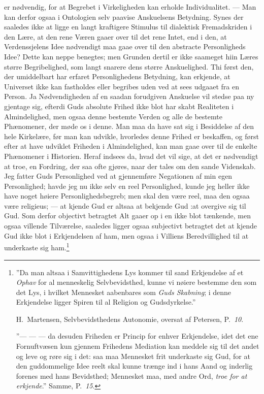 \documentclass[12pt]{book}
\renewcommand{\thefootnote}{\arabic{footnote})}
\newcommand{\dsi}{\reflectbox{c}:}
\newcommand{\opage}[1]{\marginnote{\footnotesize\textit{[#1]}}}
\begin{document}
er nødvendig, for at Begrebet i Virkeligheden kan erholde Individualitet. ---
Man kan derfor ogsaa i Ontologien selv paavise Anskuelsens Betydning. Synes der
saaledes ikke at ligge en langt kraftigere Stimulus til dialektisk
Fremadskriden i den Lære, at den rene Væren gaaer over til det rene Intet, end
i den, at Verdenssjelens Idee nødvendigt maa gaae over til den abstracte
Personligheds Idee? Dette kan neppe benegtes; men Grunden dertil er ikke
saameget hiin Læres større Begribelighed, som langt snarere dens
\opage{46} \setcounter{footnote}{0}%
større Anskuelighed. Thi først den, der umiddelbart har erfaret
Personlighedens Betydning, kan erkjende, at Universet ikke kan fastholdes eller
begribes uden ved at sees udgaaet fra en Person. Ja Nødvendigheden af en saadan
forudgiven Anskuelse vil stedse paa ny gjentage sig, efterdi Guds absolute
Frihed ikke blot har skabt Realiteten i Almindelighed, men ogsaa denne bestemte
Verden og alle de bestemte Phænomener, der møde os i denne. Man maa da have sat
sig i Besiddelse af den hele Kirkelære, før man kan udvikle, hvorledes denne
Frihed er beskaffen, og først efter at have udviklet Friheden i Almindelighed,
kan man gaae over til de enkelte Phænomener i Historien. Heraf indsees da, hvad
det vil sige, at det er nødvendigt at troe, en Fordring, der saa ofte gjøres,
naar der tales om den sande Videnskab. Jeg fatter Guds Personlighed ved at
gjennemføre Negationen af min egen Personlighed; havde jeg nu ikke selv en reel
Personlighed, kunde jeg heller ikke have noget høiere Personlighedsbegreb; men
skal den være reel, maa den ogsaa være religieus; --- at kjende Gud er altsaa
at bekjende Gud \dsi at overgive sig til Gud. Som derfor objectivt betragtet
Alt gaaer op i en ikke blot tænkende, men ogsaa villende Tilværelse, saaledes
ligger ogsaa subjectivt betragtet det at kjende Gud ikke blot i Erkjendelsen af
ham, men ogsaa i Villiens Beredvillighed til at underkaste sig
ham.\footnote{”Da man altsaa i Samvittighedens Lys kommer til sand Erkjendelse
af et \emph{Ophav} for al menneskelig Selvbevidsthed, kunne vi nøiere bestemme
den som det Lys, i hvilket Mennesket aabenbares som \emph{Guds Skabning}; i
denne Erkjendelse ligger Spiren til al Religion og Gudsdyrkelse.”
\par H.\ Martensen, Selvbevidsthedens Autonomie, oversat af Petersen,
P.\ \textit{10}.
\par ”--- --- --- da desuden Friheden er Princip for enhver Erkjendelse, idet
det ene Fornuftvæsen kun gjennem Frihedens Mediation kan meddele sig til det
andet og leve og røre sig i det: saa maa Mennesket frit underkaste sig Gud, for
at den guddommelige Idee reelt skal kunne trænge ind i hans Aand og inderlig
forenes med hans Bevidsthed; Mennesket maa, med andre Ord, \emph{troe for at
erkjende}.” Samme, P.\ \textit{15}.}
\end{document}
